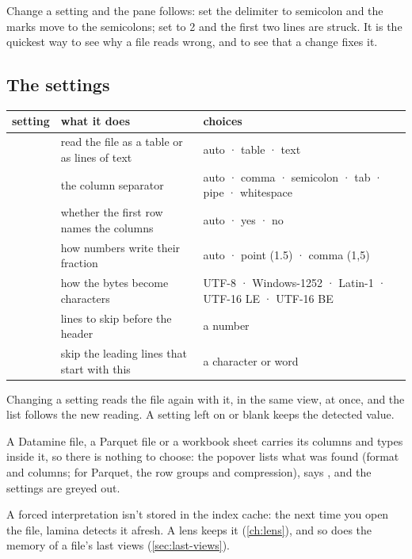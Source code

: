 Change a setting and the pane follows: set the delimiter to semicolon and the marks move to the
semicolons; set  to 2 and the first two lines are struck. It is the quickest way to see why a
file reads wrong, and to see that a change fixes it.

\subsection{The settings}

\begin{center}\small
\begin{tabularx}{\linewidth}{@{}lML@{}}
\toprule
\sffamily\bfseries setting & \sffamily\bfseries what it does & \sffamily\bfseries choices \\
\midrule
{} & read the file as a table or as lines of text & auto · table · text \\
 & the column separator & auto · comma · semicolon · tab · pipe · whitespace \\
 & whether the first row names the columns & auto · yes · no \\
 & how numbers write their fraction & auto · point (1.5) · comma (1,5) \\
 & how the bytes become characters & UTF-8 · Windows-1252 · Latin-1 · UTF-16 LE · UTF-16 BE \\
 & lines to skip before the header & a number \\
 & skip the leading lines that start with this & a character or word \\
\bottomrule
\end{tabularx}
\end{center}

Changing a setting reads the file again with it, in the same view, at once, and the  list
follows the new reading. A setting left on  or blank keeps the detected value.

A Datamine file, a Parquet file or a workbook sheet carries its columns and types inside it, so there is
nothing to choose: the popover lists what was found (format and columns; for Parquet, the row groups and
compression), says , and the settings are greyed out.

\begin{note}
A forced interpretation isn't stored in the index cache: the next time you open the file, lamina detects
it afresh. A lens keeps it (\cref{ch:lens}), and so does the memory of a file's last views
(\cref{sec:last-views}).
\end{note}

